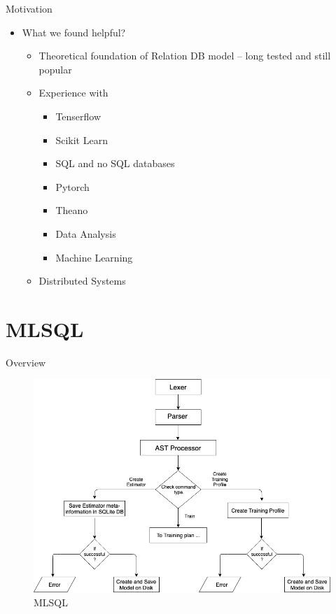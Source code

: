 \documentclass[handout, xcolor={dvipsnames}]{beamer}
\begin{document}
\begin{frame}{Motivation}{}
  \begin{itemize}
  \item<1-> {
   What we found helpful?
   \begin{itemize}
       \item<1->  Theoretical foundation of Relation DB model -- long tested and still popular
       \vspace{.2in}
       \item<2-> Experience with 
        \begin{itemize}
            
            \item<3-> Tenserflow 
            \item<4-> Scikit Learn
            \item<5-> SQL and no SQL databases
            \item<6-> Pytorch
            \item<7-> Theano
            \item<8-> Data Analysis
            \item<9-> Machine Learning
        \end{itemize}
        \vspace{.2in}
       \item<10-> Distributed Systems
   \end{itemize}
  }

  \end{itemize}
\end{frame}
\section{MLSQL}
\begin{frame}{Overview}{}
  \begin{figure}
      \centering
      \includegraphics[scale = 0.25]{flow_chart_broad.png}
      \caption{MLSQL}
      \label{fig:flow_broad}
  \end{figure}
\end{frame}
\end{document}

